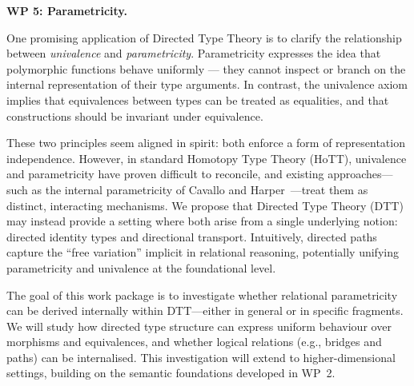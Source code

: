 \documentclass[a4paper,11pt]{article}
\renewcommand{\paragraph}[1]{\textbf{#1.}}
\begin{document}

\paragraph{WP 5: Parametricity}

One promising application of Directed Type Theory is to clarify the
relationship between \emph{univalence} and
\emph{parametricity}. Parametricity expresses the idea that
polymorphic functions behave uniformly — they cannot inspect or branch
on the internal representation of their type arguments. In contrast,
the univalence axiom implies that equivalences between types can be
treated as equalities, and that constructions should be invariant
under equivalence.



These two principles seem aligned in spirit: both enforce a form of
representation independence. However, in standard Homotopy Type Theory
(HoTT), univalence and parametricity have proven difficult to
reconcile, and existing approaches—such as the internal parametricity
of Cavallo and Harper~\cite{cavallo2020}—treat them as distinct,
interacting mechanisms. We propose that Directed Type Theory (DTT) may
instead provide a setting where both arise from a single underlying
notion: directed identity types and directional
transport. Intuitively, directed paths capture the “free variation”
implicit in relational reasoning, potentially unifying parametricity
and univalence at the foundational level.

The goal of this work package is to investigate whether relational
parametricity can be derived internally within DTT—either in general
or in specific fragments. We will study how directed type structure
can express uniform behaviour over morphisms and equivalences, and
whether logical relations (e.g., bridges and paths) can be
internalised. This investigation will extend to higher-dimensional
settings, building on the semantic foundations developed in WP~2.
\end{document}
